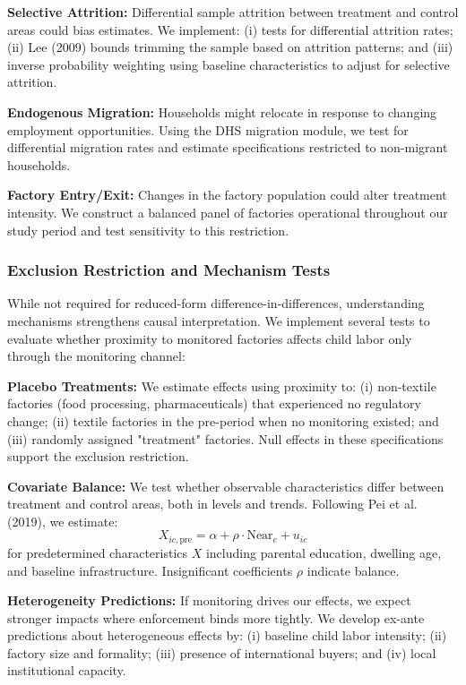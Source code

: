 \documentclass[12pt]{article}
\begin{document}
\textbf{Selective Attrition:} Differential sample attrition between treatment and control areas could bias estimates. We implement: (i) tests for differential attrition rates; (ii) Lee (2009) bounds trimming the sample based on attrition patterns; and (iii) inverse probability weighting using baseline characteristics to adjust for selective attrition.

\textbf{Endogenous Migration:} Households might relocate in response to changing employment opportunities. Using the DHS migration module, we test for differential migration rates and estimate specifications restricted to non-migrant households.

\textbf{Factory Entry/Exit:} Changes in the factory population could alter treatment intensity. We construct a balanced panel of factories operational throughout our study period and test sensitivity to this restriction.

\subsubsection{Exclusion Restriction and Mechanism Tests}

While not required for reduced-form difference-in-differences, understanding mechanisms strengthens causal interpretation. We implement several tests to evaluate whether proximity to monitored factories affects child labor only through the monitoring channel:

\textbf{Placebo Treatments:} We estimate effects using proximity to: (i) non-textile factories (food processing, pharmaceuticals) that experienced no regulatory change; (ii) textile factories in the pre-period when no monitoring existed; and (iii) randomly assigned "treatment" factories. Null effects in these specifications support the exclusion restriction.

\textbf{Covariate Balance:} We test whether observable characteristics differ between treatment and control areas, both in levels and trends. Following Pei et al. (2019), we estimate:
\begin{equation}
X_{ic,\text{pre}} = \alpha + \rho \cdot \text{Near}_c + u_{ic}
\end{equation}
for predetermined characteristics $X$ including parental education, dwelling age, and baseline infrastructure. Insignificant coefficients $\rho$ indicate balance.

\textbf{Heterogeneity Predictions:} If monitoring drives our effects, we expect stronger impacts where enforcement binds more tightly. We develop ex-ante predictions about heterogeneous effects by: (i) baseline child labor intensity; (ii) factory size and formality; (iii) presence of international buyers; and (iv) local institutional capacity.
\end{document}
